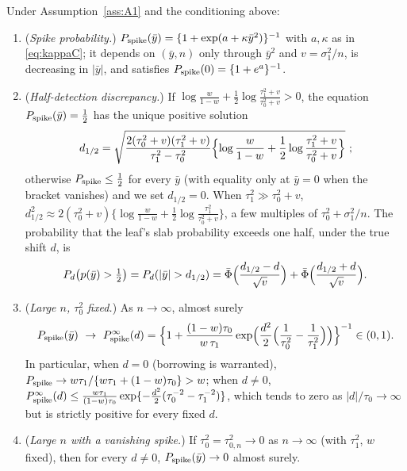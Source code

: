 \begin{thmA}\label{thm:T2}
Under Assumption~\ref{ass:A1} and the conditioning above:
\begin{enumerate}[label=(\alph*),leftmargin=2.2em]
\item (\emph{Spike probability.}) $P_{\mathrm{spike}}(\bar y)=\{1+\exp(a+\kappa\bar y^2)\}^{-1}$ with $a,\kappa$ as in \eqref{eq:kappaC}; it depends on $(\bar y,n)$ only through $\bar y^2$ and $v=\sigma_1^2/n$, is decreasing in $|\bar y|$, and satisfies $P_{\mathrm{spike}}(0)=\{1+e^{a}\}^{-1}$.
\item (\emph{Half-detection discrepancy.}) If $\log\frac{w}{1-w}+\frac12\log\frac{\tau_1^2+v}{\tau_0^2+v}>0$, the equation $P_{\mathrm{spike}}(\bar y)=\tfrac12$ has the unique positive solution
\begin{equation}
d_{1/2}=\sqrt{\frac{2(\tau_0^2+v)(\tau_1^2+v)}{\tau_1^2-\tau_0^2}\Bigl\{\log\frac{w}{1-w}+\frac12\log\frac{\tau_1^2+v}{\tau_0^2+v}\Bigr\}}\ ;
\label{eq:dhalf}
\end{equation}
otherwise $P_{\mathrm{spike}}\le\tfrac12$ for every $\bar y$ (with equality only at $\bar y=0$ when the bracket vanishes) and we set $d_{1/2}=0$. When $\tau_1^2\gg\tau_0^2+v$, $d_{1/2}^2\approx2(\tau_0^2+v)\{\log\frac{w}{1-w}+\frac12\log\frac{\tau_1^2}{\tau_0^2+v}\}$, a few multiples of $\tau_0^2+\sigma_1^2/n$. The probability that the leaf's slab probability exceeds one half, under the true shift $d$, is
\begin{equation}
P_d\bigl(p(\bar y)>\tfrac12\bigr)=P_d(|\bar y|>d_{1/2})=\Phibar\Bigl(\frac{d_{1/2}-d}{\sqrt v}\Bigr)+\Phibar\Bigl(\frac{d_{1/2}+d}{\sqrt v}\Bigr).
\label{eq:detectprob}
\end{equation}
\item (\emph{Large $n$, $\tau_0^2$ fixed.}) As $n\to\infty$, almost surely
\begin{equation}
\Pspike(\bar y)\ \to\ \Pspike^\infty(d)=\Bigl\{1+\frac{(1-w)\tau_0}{w\,\tau_1}\exp\Bigl(\frac{d^2}{2}\Bigl(\frac1{\tau_0^2}-\frac1{\tau_1^2}\Bigr)\Bigr)\Bigr\}^{-1}\in(0,1).
\label{eq:pinf}
\end{equation}
In particular, when $d=0$ (borrowing is warranted), $P_{\mathrm{spike}}\to w\tau_1/\{w\tau_1+(1-w)\tau_0\}>w$; when $d\ne0$, $P_{\mathrm{spike}}^\infty(d)\le\frac{w\tau_1}{(1-w)\tau_0}\exp\{-\frac{d^2}{2}(\tau_0^{-2}-\tau_1^{-2})\}$, which tends to zero as $|d|/\tau_0\to\infty$ but is strictly positive for every fixed $d$.
\item (\emph{Large $n$ with a vanishing spike.}) If $\tau_0^2=\tau_{0,n}^2\to0$ as $n\to\infty$ (with $\tau_1^2$, $w$ fixed), then for every $d\ne0$, $P_{\mathrm{spike}}(\bar y)\to0$ almost surely.
\end{enumerate}
\end{thmA}

